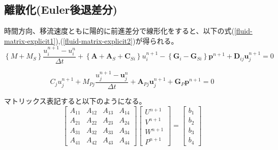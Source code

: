 \subsection{離散化(Euler後退差分)}
時間方向、移流速度ともに陽的に前進差分で線形化をすると、以下の式(\ref{fluid-matrix-explicit1}),(\ref{fluid-matrix-explicit2})が得られる。
\begin{equation}
\label{fluid-matrix-explicit1}
		\left\{M+M_S\right\} \frac{u_i^{n+1}-u_i^n}{\Delta t}
		+ \left\{\bm{A}+\bm{A}_S + \bm{C}_{Si}\right\} u_i^{n+1}
		-\left\{\bm{G}_i-\bm{G}_{S i}\right\} \bm{p}^{n+1}
		+\bm{D}_{i j} \bm{u}_j^{n+1}=0
\end{equation}

\begin{equation}
\label{fluid-matrix-explicit2}
		C_j u_j^{n+1}+M_{P j} \frac{u_j^{n+1}-\bm{u}_j^n}{\Delta t}
		+\bm{A}_{P j} \bm{u}_j^{n+1}
		+\bm{G}_P \bm{p}^{n+1}=0
\end{equation}

マトリックス表記すると以下のようになる。
\begin{equation}
	\left[\begin{array}{llll}
		A_{11} & A_{12} & A_{13} & A_{14}\\ 
		A_{21} & A_{22} & A_{23} & A_{24}\\ 
		A_{31} & A_{32} & A_{33} & A_{34}\\
		A_{41} & A_{42} & A_{43} & A_{44}
	\end{array}
	\right]\left
	[
	\begin{array}{l}
		U^{n+1} \\ 
		V^{n+1} \\
		W^{n+1} \\
		P^{n+1}
	\end{array}
	\right]
	=\left[
	\begin{array}{l}
		b_1 \\ 
		b_2 \\ 
		b_3 \\
		b_4
	\end{array}
	\right]
\end{equation}

